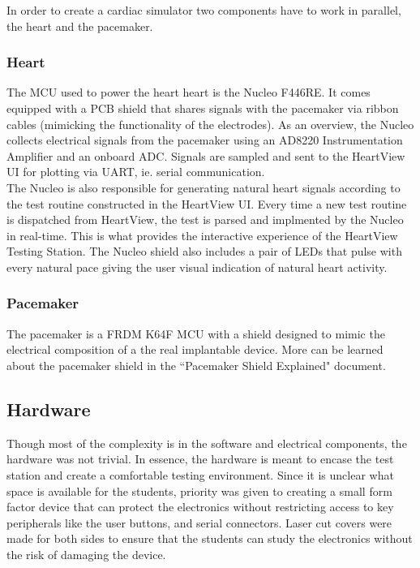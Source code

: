 \documentclass[11pt,fleqn]{book} %
\begin{document}
In order to create a cardiac simulator two components have to work in parallel, the heart and the pacemaker. 


\subsubsection{Heart}

The \ac{MCU} used to power the heart heart is the Nucleo F446RE. It comes equipped with a \ac{PCB} shield that shares signals with the pacemaker via ribbon cables (mimicking the functionality of the electrodes). As an overview, the Nucleo collects electrical signals from the pacemaker using an AD8220 Instrumentation Amplifier and an onboard \ac{ADC}. Signals are sampled and sent to the HeartView UI for plotting via \ac{UART}, ie. serial communication.\\ 

The Nucleo is also responsible for generating natural heart signals according to the test routine constructed in the HeartView UI. Every time a new test routine is dispatched from HeartView, the test is parsed and implmented by the Nucleo in real-time. This is what provides the interactive experience of the HeartView Testing Station. The Nucleo shield also includes a pair of LEDs that pulse with every natural pace giving the user visual indication of natural heart activity.

\subsubsection{Pacemaker}

The pacemaker is a FRDM K64F \ac{MCU} with a shield designed to mimic the electrical composition of a the real implantable device. More can be learned about the pacemaker shield in the ``Pacemaker Shield Explained" document.


\subsection{Hardware}

Though most of the complexity is in the software and electrical components, the hardware was not trivial. In essence, the hardware is meant to encase the test station and create a comfortable testing environment. Since it is unclear what space is available for the students, priority was given to creating a small form factor device that can protect the electronics without restricting access to key peripherals like the user buttons, and serial connectors. Laser cut covers were made for both sides to ensure that the students can study the electronics without the risk of damaging the device.\\
\end{document}
